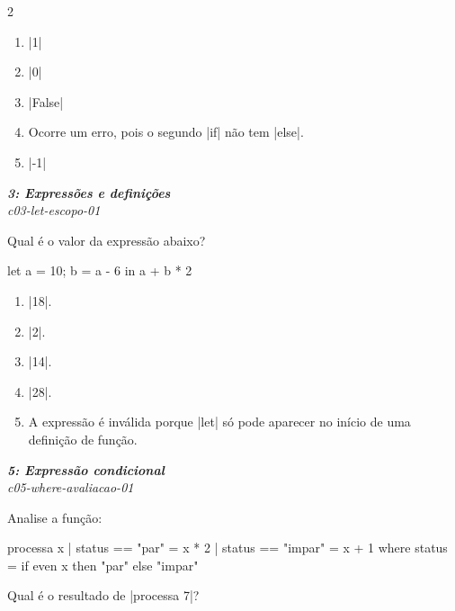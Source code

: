 \documentclass[a4paper,10pt,brazil]{article}
\begin{document}
\begin{multicols}{2}
\begin{enumerate}
  \item \haskellinline|1|

  \item \haskellinline|0|

  \item \haskellinline|False|

  \item Ocorre um erro, pois o segundo \haskellinline|if| não tem \haskellinline|else|.

  \item \haskellinline|-1|


\end{enumerate}

\begin{flushright}
  \footnotesize
  \textit{\textbf{3: Expressões e definições}}\\
  \textit{c03-let-escopo-01}\\

\end{flushright}
Qual é o valor da expressão abaixo?

\begin{haskellcode}
let a = 10; b = a - 6 in a + b * 2
\end{haskellcode}

\begin{enumerate}
  \item \haskellinline|18|.

  \item \haskellinline|2|.

  \item \haskellinline|14|.

  \item \haskellinline|28|.

  \item A expressão é inválida porque \haskellinline|let| só pode aparecer no início de uma definição de função.


\end{enumerate}

\begin{flushright}
  \footnotesize
  \textit{\textbf{5: Expressão condicional}}\\
  \textit{c05-where-avaliacao-01}\\

\end{flushright}
Analise a função:
\begin{haskellcode}
processa x
  | status == "par"   = x * 2
  | status == "impar" = x + 1
  where
    status = if even x then "par" else "impar"
\end{haskellcode}
Qual é o resultado de \haskellinline|processa 7|?


\end{multicols}
\end{document}
